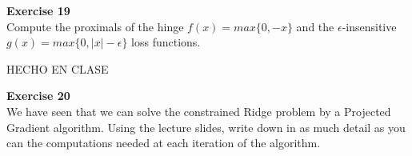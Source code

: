 \documentclass[11pt,table]{article}
\newenvironment{problem}[2][Exercise]
    { \begin{mdframed}[backgroundcolor=gray!20] \textbf{#1 #2} \\}
    {  \end{mdframed}}
\begin{document}
\begin{problem}{19}
Compute the proximals of the hinge \( f(x) = max\{0, -x\}  \) and the \( \epsilon \)-insensitive \( g(x)=max\{0, |x| - \epsilon\} \) loss functions.
\end{problem}

HECHO EN CLASE\\

\begin{problem}{20}
We have seen that we can solve the constrained Ridge problem by a Projected Gradient algorithm. Using the lecture slides, write down in as much detail as you can the computations needed at each iteration of the algorithm.
\end{problem}
\end{document}
